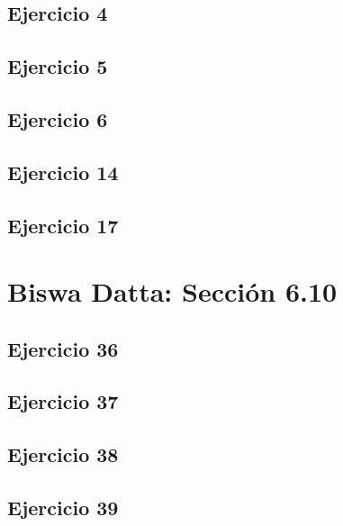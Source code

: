 \documentclass[12pt]{article}
\begin{document}
\subsection{Ejercicio 4}
 

\subsection{Ejercicio 5}
 

\subsection{Ejercicio 6}


\subsection{Ejercicio 14}
 

\subsection{Ejercicio 17}


%
\section{Biswa Datta: Sección 6.10}

\subsection{Ejercicio 36}
 

\subsection{Ejercicio 37}
 

\subsection{Ejercicio 38}
 

\subsection{Ejercicio 39}

\end{document}
